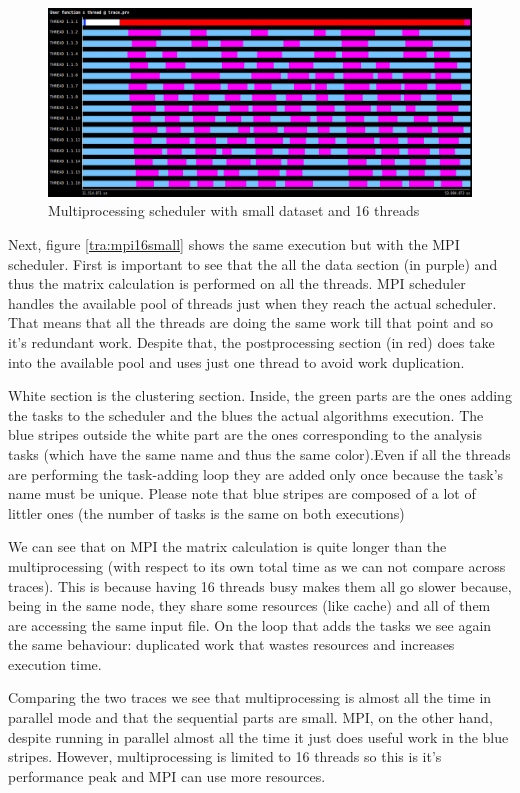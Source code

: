 \begin{figure}[h]
\includegraphics[width=\textwidth]{traces/par_16_small.png}
\caption{Multiprocessing scheduler with small dataset and 16 threads}
\label{tra:par16small}
\end{figure}

Next, figure \ref{tra:mpi16small} shows the same execution but with the MPI scheduler. First is important to see that the all the data section (in purple) and thus the matrix calculation is performed on all the threads. MPI scheduler handles the available pool of threads just when they reach the actual scheduler. That means that all the threads are doing the same work till that point and so it's redundant work. Despite that, the postprocessing section (in red) does take into the available pool and uses just one thread to avoid work duplication. 

White section is the clustering section. Inside, the green parts are the ones adding the tasks to the scheduler and the blues the actual algorithms execution. The blue stripes outside the white part are the ones corresponding to the analysis tasks (which have the same name and thus the same color).Even if all the threads are performing the task-adding loop they are added only once because the task's name must be unique. Please note that blue stripes are composed of a lot of littler ones (the number of tasks is the same on both executions)  

We can see that on MPI the matrix calculation is quite longer than the multiprocessing (with respect to its own total time as we can not compare across traces). This is because having 16 threads busy makes them all go slower because, being in the same node, they share some resources (like cache) and all of them are accessing the same input file. On the loop that adds the tasks we see again the same behaviour: duplicated work that wastes resources and increases execution time. 

Comparing the two traces we see that multiprocessing is almost all the time in parallel mode and that the sequential parts are small. MPI, on the other hand, despite running in parallel almost all the time it just does useful work in the blue stripes. However, multiprocessing is limited to 16 threads so this is it's performance peak and MPI can use more resources.

